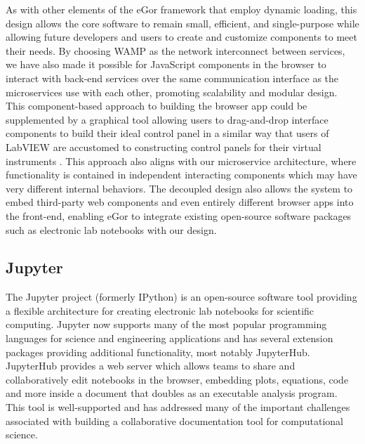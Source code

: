 \documentclass[../thesis]{subfiles}
\begin{document}
As with other elements of the eGor framework that employ dynamic
loading, this design allows the core software to remain small,
efficient, and single-purpose while allowing future developers and
users to create and customize components to meet their needs.  By
choosing \gls{WAMP} as the network interconnect between services, we
have also made it possible for JavaScript components in the browser to
interact with back-end services over the same communication interface
as the microservices use with each other, promoting scalability and
modular design. This component-based approach to building the browser
app could be supplemented by a graphical tool allowing users to
drag-and-drop interface components to build their ideal control panel
in a similar way that users of LabVIEW are accustomed to constructing
control panels for their virtual instruments \cite{LabVIEW}. This
approach also aligns with our microservice architecture, where
functionality is contained in independent interacting components which
may have very different internal behaviors. The decoupled design also
allows the system to embed third-party web components and even
entirely different browser apps into the front-end, enabling eGor to
integrate existing open-source software packages such as electronic lab
notebooks with our design.

\subsection{Jupyter}
The Jupyter project (formerly IPython) is an open-source software tool
providing a flexible architecture for creating electronic lab
notebooks for scientific computing. Jupyter now supports many of the
most popular programming languages for science and engineering
applications and has several extension packages providing additional
functionality, most notably JupyterHub. JupyterHub provides a web
server which allows teams to share and collaboratively edit notebooks
in the browser, embedding plots, equations, code and more inside a
document that doubles as an executable analysis program. This tool is
well-supported and has addressed many of the important challenges
associated with building a collaborative documentation tool for
computational science.
\end{document}
